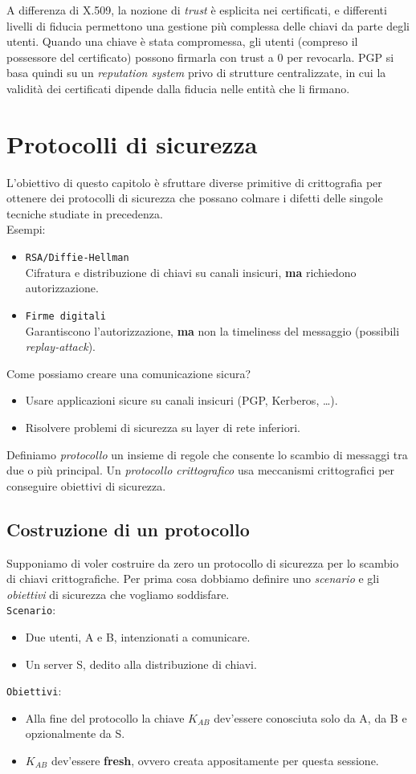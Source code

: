 \documentclass[a4paper, 11pt, twoside, openright, fleqn]{report}
\begin{document}
A differenza di X.509, la nozione di \emph{trust} è esplicita nei certificati, e differenti livelli di fiducia permettono una gestione più complessa delle chiavi da parte degli utenti. Quando una chiave è stata compromessa, gli utenti (compreso il possessore del certificato) possono firmarla con trust a 0 per revocarla. PGP si basa quindi su un \emph{reputation system} privo di strutture centralizzate, in cui la validità dei certificati dipende dalla fiducia nelle entità che li firmano.


\chapter{Protocolli di sicurezza}
L'obiettivo di questo capitolo è sfruttare diverse primitive di crittografia per ottenere dei protocolli di sicurezza che possano colmare i difetti delle singole tecniche studiate in precedenza.\\
Esempi:
\begin{itemize}
	\item \texttt{RSA/Diffie-Hellman}\\
	Cifratura e distribuzione di chiavi su canali insicuri,
	\textbf{ma} richiedono autorizzazione.
	\item \texttt{Firme digitali}\\
	Garantiscono l'autorizzazione,
	\textbf{ma} non la timeliness del messaggio (possibili \emph{replay-attack}).
\end{itemize}
Come possiamo creare una comunicazione sicura?
\begin{itemize}
	\item Usare applicazioni sicure su canali insicuri (PGP, Kerberos, \dots).
	\item Risolvere problemi di sicurezza su layer di rete inferiori.
\end{itemize}
Definiamo \emph{protocollo} un insieme di regole che consente lo scambio di messaggi tra due o più principal. Un \emph{protocollo crittografico} usa meccanismi crittografici per conseguire obiettivi di sicurezza.

\section{Costruzione di un protocollo}
Supponiamo di voler costruire da zero un protocollo di sicurezza per lo scambio di chiavi crittografiche. Per prima cosa dobbiamo definire uno \emph{scenario} e gli \emph{obiettivi} di sicurezza che vogliamo soddisfare.\\
\texttt{Scenario}:
\begin{itemize}
	\item Due utenti, A e B, intenzionati a comunicare.
	\item Un server S, dedito alla distribuzione di chiavi.
\end{itemize}
\texttt{Obiettivi}:
\begin{itemize}
	\item Alla fine del protocollo la chiave $K_{AB}$ dev'essere conosciuta solo da A, da B e opzionalmente da S.
	\item $K_{AB}$ dev'essere \textbf{fresh}, ovvero creata appositamente per questa sessione.
\end{itemize}
\end{document}
